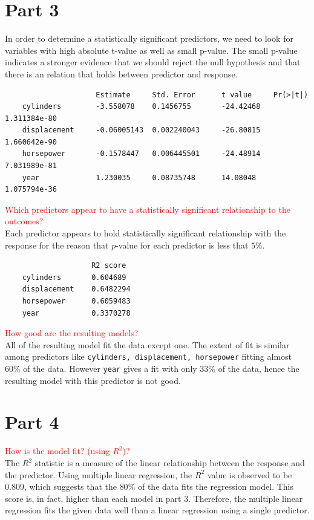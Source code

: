 \documentclass{article}[a4paper]
\begin{document}
\section*{Part 3}
In order to determine a statistically significant predictors, we need to look for variables with high absolute t-value as well as small p-value. The small p-value indicates a stronger evidence that we should reject the null hypothesis and that there is an relation that holds between predictor and response.
\begin{lstlisting}
                     Estimate     Std. Error      t value     Pr(>|t|)
    cylinders        -3.558078    0.1456755       -24.42468   1.311384e-80
    displacement     -0.06005143  0.002240043     -26.80815   1.660642e-90
    horsepower       -0.1578447   0.006445501     -24.48914   7.031989e-81
    year             1.230035     0.08735748      14.08048    1.075794e-36
\end{lstlisting}
\textcolor{red}{Which predictors appear to have a statistically significant relationship to the outcomes?}\\
Each predictor appears to hold statistically significant relationship with the response for the reason that $p$-value for each predictor is less that $5\%$.
\begin{lstlisting}
                    R2 score 
    cylinders       0.604689
    displacement    0.6482294
    horsepower      0.6059483
    year            0.3370278
\end{lstlisting}
\textcolor{red}{How good are the resulting models?}\\
All of the resulting model fit the data except one. The extent of fit is similar among predictors like \texttt{cylinders, displacement, horsepower} fitting almost $60\%$ of the data. However \texttt{year} gives a fit with only $33\%$ of the data, hence the resulting model with this predictor is not good.


\section*{Part 4}
\textcolor{red}{How is the model fit? (using $R^2$)?}\\
The $R^2$ statistic is a measure of the linear relationship between the response and the predictor. Using multiple linear regression, the $R^2$ value is observed to be $0.809$, which suggests that the $80\%$ of the data fits the regression model. This score is, in fact, higher than each model in part 3. Therefore, the multiple linear regression fits the given data well than a linear regression using a single predictor.
\end{document}
